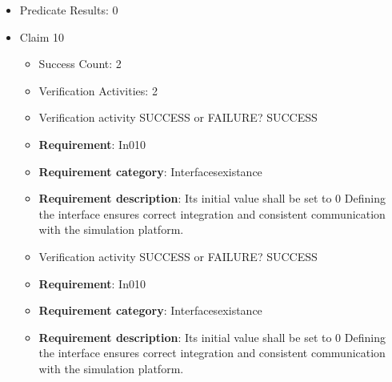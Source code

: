\documentclass{article}
\begin{document}
\begin{itemize}
\begin{itemize}
						\item \textbf{Requirement}: In009 
						\item \textbf{Requirement category}: Interfacesexistance 
						\item \textbf{Requirement description}: Its initial value shall be set to 0 Defining the interface ensures correct integration and consistent communication with the simulation platform.
					
					\item Verification activity SUCCESS or FAILURE? SUCCESS
		
						\item \textbf{Requirement}: In009 
						\item \textbf{Requirement category}: Interfacesexistance 
						\item \textbf{Requirement description}: Its initial value shall be set to 0 Defining the interface ensures correct integration and consistent communication with the simulation platform.
					
				\end{itemize}
				
									    
				\item Predicate Results: 0

  				  \item Claim 10
				\begin{itemize}
			    	\item Success Count: 2 
			    	\item Verification Activities: 2
					\item Verification activity SUCCESS or FAILURE? SUCCESS
		
						\item \textbf{Requirement}: In010 
						\item \textbf{Requirement category}: Interfacesexistance 
						\item \textbf{Requirement description}: Its initial value shall be set to 0 Defining the interface ensures correct integration and consistent communication with the simulation platform.
					
					\item Verification activity SUCCESS or FAILURE? SUCCESS
		
						\item \textbf{Requirement}: In010 
						\item \textbf{Requirement category}: Interfacesexistance 
						\item \textbf{Requirement description}: Its initial value shall be set to 0 Defining the interface ensures correct integration and consistent communication with the simulation platform.
					

\end{itemize}
\end{itemize}
\end{document}
